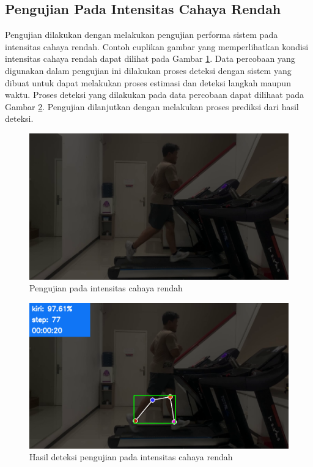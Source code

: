 \subsection{Pengujian Pada Intensitas Cahaya Rendah}
\label{subsec:PengujianIntensitasRendah}

Pengujian dilakukan dengan melakukan pengujian performa sistem pada intensitas cahaya rendah. Contoh cuplikan gambar yang memperlihatkan kondisi intensitas cahaya rendah dapat dilihat pada Gambar \ref{fig:PengujianIntensitasRendah}. Data percobaan yang digunakan dalam pengujian ini dilakukan proses deteksi dengan sistem yang dibuat untuk dapat melakukan proses estimasi dan deteksi langkah maupun waktu. Proses deteksi yang dilakukan pada data percobaan dapat dilihaat pada Gambar \ref{fig:PengujianIntensitasRendah2}. Pengujian dilanjutkan dengan melakukan proses prediksi dari hasil deteksi.

\begin{figure}[H]
  \centering
  \includegraphics[scale=0.5]{gambar/cahaya_rendah.png}
  \caption{Pengujian pada intensitas cahaya rendah}
  \label{fig:PengujianIntensitasRendah}
\end{figure}

\begin{figure}[H]
  \centering
  \includegraphics[scale=0.5]{gambar/cahaya_rendah2.png}
  \caption{Hasil deteksi pengujian pada intensitas cahaya rendah}
  \label{fig:PengujianIntensitasRendah2}
\end{figure}

